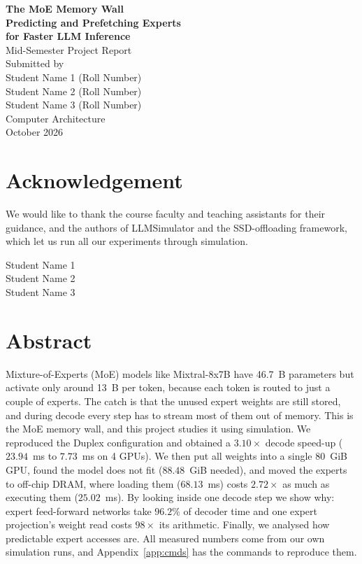 \documentclass[11pt,a4paper]{report}
\begin{document}
\begin{titlepage}
\begin{center}
\vspace*{2cm}
{\LARGE\bfseries The MoE Memory Wall}\\[0.4cm]
{\LARGE\bfseries Predicting and Prefetching Experts\\[0.2cm] for Faster LLM Inference}\\[1cm]
{\large Mid-Semester Project Report}\\[3cm]

{\large Submitted by}\\[0.5cm]
{\large Student Name 1 (Roll Number)}\\
{\large Student Name 2 (Roll Number)}\\
{\large Student Name 3 (Roll Number)}\\[2.5cm]
{\large Computer Architecture}\\[0.4cm]
{\large October 2026}
\vfill
\end{center}
\end{titlepage}

\chapter*{Acknowledgement}

We would like to thank the course faculty and teaching assistants for their guidance, and the authors of LLMSimulator and the SSD-offloading framework, which let us run all our experiments through simulation.

\vspace{0.8cm}
\begin{flushright}
Student Name 1\\
Student Name 2\\
Student Name 3
\end{flushright}

\clearpage

\chapter*{Abstract}

Mixture-of-Experts (MoE) models like Mixtral-8x7B have 46.7~B parameters but activate only around 13~B per token, because each token is routed to just a couple of experts. The catch is that the unused expert weights are still stored, and during decode every step has to stream most of them out of memory. This is the MoE memory wall, and this project studies it using simulation. We reproduced the Duplex configuration and obtained a $3.10\times$ decode speed-up ($23.94$~ms to $7.73$~ms on 4 GPUs). We then put all weights into a single 80~GiB GPU, found the model does not fit ($88.48$~GiB needed), and moved the experts to off-chip DRAM, where loading them ($68.13$~ms) costs $2.72\times$ as much as executing them ($25.02$~ms). By looking inside one decode step we show why: expert feed-forward networks take $96.2\%$ of decoder time and one expert projection's weight read costs $98\times$ its arithmetic. Finally, we analysed how predictable expert accesses are. All measured numbers come from our own simulation runs, and Appendix~\ref{app:cmds} has the commands to reproduce them.
\end{document}
